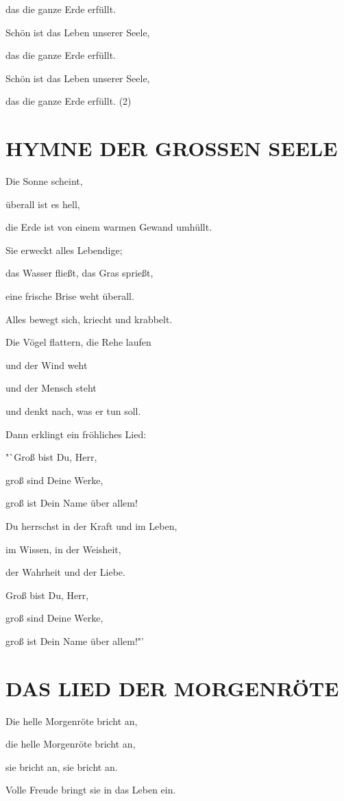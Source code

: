 \documentclass[11pt,a5paper,twoside]{article}
\begin{document}
das die ganze Erde erfüllt. 

Schön ist das Leben unserer Seele, 

das die ganze Erde erfüllt. 

Schön ist das Leben unserer Seele, 

das die ganze Erde erfüllt. (2)


\section[Hymne der großen Seele]{HYMNE DER GROSSEN SEELE}

Die Sonne scheint, 

überall ist es hell, 

die Erde ist von einem warmen Gewand umhüllt. 

Sie erweckt alles Lebendige; 

das Wasser fließt, das Gras sprießt, 

eine frische Brise weht überall. 

Alles bewegt sich, kriecht und krabbelt.

Die Vögel flattern, die Rehe laufen 

und der Wind weht 

und der Mensch steht

und denkt nach, was er tun soll. 

Dann erklingt ein fröhliches Lied:

"`Groß bist Du, Herr,

 groß sind Deine Werke, 
 
 groß ist Dein Name über allem!

Du herrschst in der Kraft und im Leben,

im Wissen, in der Weisheit, 

der Wahrheit und der Liebe.

Groß bist Du, Herr, 

groß sind Deine Werke, 

groß ist Dein Name über allem!"'


\section[Das Lied der Morgenröte]{DAS LIED DER MORGENRÖTE}

Die helle Morgenröte bricht an,

die helle Morgenröte bricht an,

sie bricht an, sie bricht an.

Volle Freude bringt sie in das Leben ein.
\end{document}
